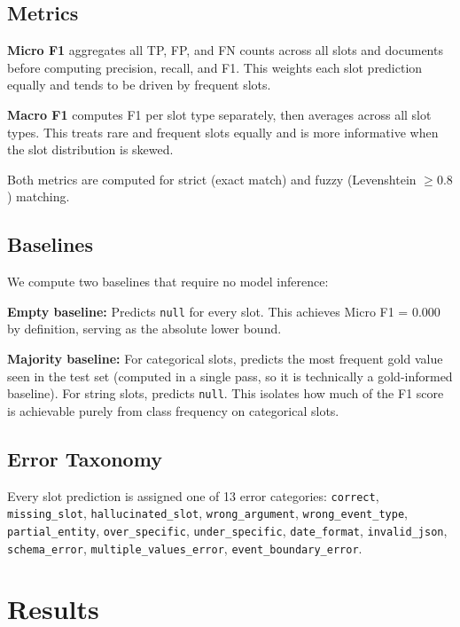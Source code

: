 \documentclass[11pt,a4paper]{article}
\begin{document}
\subsection{Metrics}

\textbf{Micro F1} aggregates all TP, FP, and FN counts across all slots and documents before computing precision, recall, and F1. This weights each slot prediction equally and tends to be driven by frequent slots.

\textbf{Macro F1} computes F1 per slot type separately, then averages across all slot types. This treats rare and frequent slots equally and is more informative when the slot distribution is skewed.

Both metrics are computed for strict (exact match) and fuzzy (Levenshtein $\geq 0.8$) matching.

\subsection{Baselines}

We compute two baselines that require no model inference:

\textbf{Empty baseline:} Predicts \texttt{null} for every slot. This achieves Micro F1 = 0.000 by definition, serving as the absolute lower bound.

\textbf{Majority baseline:} For categorical slots, predicts the most frequent gold value seen in the test set (computed in a single pass, so it is technically a gold-informed baseline). For string slots, predicts \texttt{null}. This isolates how much of the F1 score is achievable purely from class frequency on categorical slots.

\subsection{Error Taxonomy}

Every slot prediction is assigned one of 13 error categories: \texttt{correct}, \texttt{missing\_slot}, \texttt{hallucinated\_slot}, \texttt{wrong\_argument}, \texttt{wrong\_event\_type}, \texttt{partial\_entity}, \texttt{over\_specific}, \texttt{under\_specific}, \texttt{date\_format}, \texttt{invalid\_json}, \texttt{schema\_error}, \texttt{multiple\_values\_error}, \texttt{event\_boundary\_error}.

\section{Results}
\label{sec:results}
\end{document}
